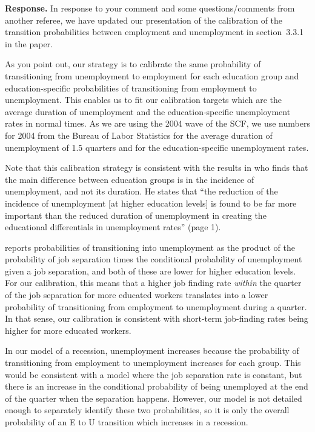 \documentclass[12pt,letterpaper,english]{article}
\begin{document}
\begin{itemize}
	\noindent \textbf{Response.} In response to your comment and some questions/comments from another referee, we have updated our presentation of the calibration of the transition probabilities between employment and unemployment in section~3.3.1 in the paper. 
	
	As you point out, our strategy is to calibrate the same probability of transitioning from unemployment to employment for each education group and education-specific probabilities of transitioning from employment to unemployment. This enables us to fit our calibration targets which are the average duration of unemployment and the education-specific unemployment rates in normal times. As we are using the 2004 wave of the SCF, we use numbers for 2004 from the Bureau of Labor Statistics for the average duration of unemployment of 1.5 quarters and for the education-specific unemployment rates. 
	
	Note that this calibration strategy is consistent with the results in \citet{mincer1991education} who finds that the main difference between education groups is in the incidence of unemployment, and not its duration. He states that ``the reduction of the incidence of unemployment [at higher education levels] is found to be far more important than the reduced duration of unemployment in creating the educational differentials in unemployment rates'' (page 1).
	
	\citeauthor{mincer1991education} reports probabilities of transitioning into unemployment as the product of the probability of job separation times the conditional probability of unemployment given a job separation, and both of these are lower for higher education levels. For our calibration, this means that a higher job finding rate \textit{within} the quarter of the job separation for more educated workers translates into a lower probability of transitioning from employment to unemployment during a quarter. In that sense, our calibration is consistent with short-term job-finding rates being higher for more educated workers. 
	
	In our model of a recession, unemployment increases because the probability of transitioning from employment to unemployment increases for each group. This would be consistent with a model where the job separation rate is constant, but there is an increase in the conditional probability of being unemployed at the end of the quarter when the separation happens. However, our model is not detailed enough to separately identify these two probabilities, so it is only the overall probability of an E to U transition which increases in a recession. 
	

\end{itemize}
\end{document}
